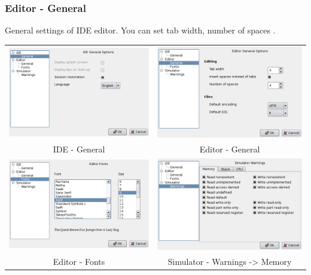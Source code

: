     \subsubsection{Editor - General}
        General settings of IDE editor. You can set tab width, number of spaces .

        \begin{table}[h!]
            \begin{tabular}{cc}
                \includegraphics[width=.4\textwidth]{img/interface1.png}
                    &
                \includegraphics[width=.4\textwidth]{img/interface2.png}
                    \\
                IDE - General & Editor - General
                    \\
                \includegraphics[width=.4\textwidth]{img/interface3.png}
                    &
                \includegraphics[width=.4\textwidth]{img/interface4.png}
                    \\
                Editor - Fonts & Simulator - Warnings -> Memory
                    \\

\end{tabular}
\end{table}
